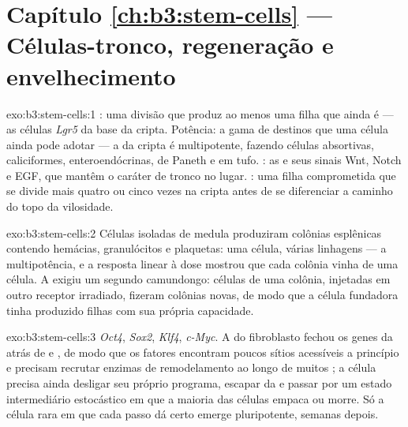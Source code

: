 \section*{Capítulo \ref{ch:b3:stem-cells} --- Células-tronco, regeneração e envelhecimento}

\begin{solution}{exo:b3:stem-cells:1}
: uma divisão que produz ao menos uma filha que ainda é
 --- as células \emph{Lgr5} da base da cripta. Potência: a
gama de destinos que uma célula ainda pode adotar --- a  da
cripta é multipotente, fazendo células absortivas, caliciformes,
enteroendócrinas, de Paneth e em tufo. : as  e seus
sinais Wnt, Notch e EGF, que mantêm o caráter de tronco no lugar. : uma filha comprometida que se divide mais
quatro ou cinco vezes na cripta antes de se diferenciar a caminho do topo
da vilosidade.
\end{solution}

\begin{solution}{exo:b3:stem-cells:2}
Células isoladas de medula produziram colônias esplênicas contendo
hemácias, granulócitos e plaquetas: uma célula, várias linhagens --- a
multipotência, e a resposta linear à dose mostrou que cada colônia vinha
de uma célula. A  exigiu um segundo camundongo: células de
uma colônia, injetadas em outro receptor irradiado, fizeram colônias
novas, de modo que a célula fundadora tinha produzido filhas com sua
própria capacidade.
\end{solution}

\begin{solution}{exo:b3:stem-cells:3}
\emph{Oct4}, \emph{Sox2}, \emph{Klf4}, \emph{c-Myc}. A  do
fibroblasto fechou os genes da  atrás de  e
, de modo que os fatores encontram poucos sítios
acessíveis a princípio e precisam recrutar enzimas de remodelamento ao
longo de muitos ; a célula precisa ainda desligar seu
próprio programa, escapar da  e passar por um estado
intermediário estocástico em que a maioria das células empaca ou morre.
Só a célula rara em que cada passo dá certo emerge pluripotente, semanas
depois.
\end{solution}


